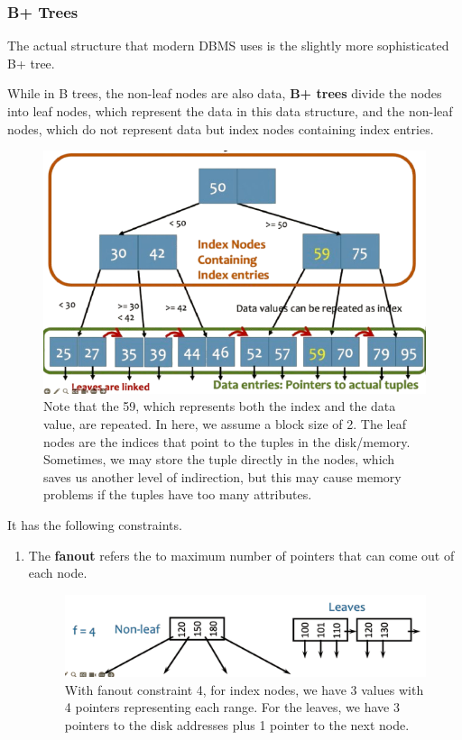 \documentclass{article}
\begin{document}
    \subsubsection{B+ Trees}

      The actual structure that modern DBMS uses is the slightly more sophisticated B+ tree. 

      \begin{definition}[B+ Tree]
        While in B trees, the non-leaf nodes are also data, \textbf{B+ trees} divide the nodes into leaf nodes, which represent the data in this data structure, and the non-leaf nodes, which do not represent data but index nodes containing index entries. 

        \begin{figure}[H]
          \centering 
          \includegraphics[scale=0.4]{img/bp_tree.png} 
          \caption{Note that the 59, which represents both the index and the data value, are repeated. In here, we assume a block size of 2. The leaf nodes are the indices that point to the tuples in the disk/memory. Sometimes, we may store the tuple directly in the nodes, which saves us another level of indirection, but this may cause memory problems if the tuples have too many attributes.} 
          \label{fig:bp_tree} 
        \end{figure}

        It has the following constraints. 
        \begin{enumerate}
          \item The \textbf{fanout} refers the to maximum number of pointers that can come out of each node. 
          \begin{figure}[H]
            \centering 
            \includegraphics[scale=0.3]{img/fanout.png}
            \caption{With fanout constraint 4, for index nodes, we have 3 values with 4 pointers representing each range. For the leaves, we have 3 pointers to the disk addresses plus 1 pointer to the next node. } 
            \label{fig:fanout}
          \end{figure}


\end{enumerate}
\end{definition}
\end{document}
